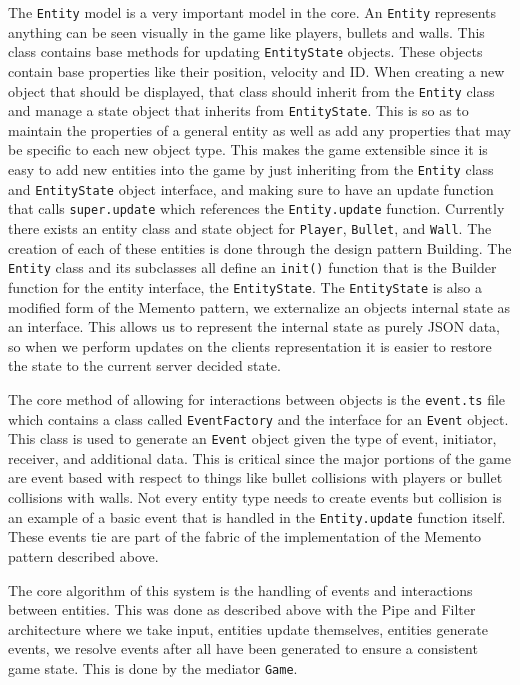 \documentclass[12pt]{report}
\begin{document}
The \texttt{Entity} model is a very important model in the core. An \texttt{Entity} represents anything can be seen visually in the game like players, bullets and walls. This class contains base methods for updating \texttt{EntityState} objects. These objects contain base properties like their position, velocity and ID. When creating a new object that should be displayed, that class should inherit from the \texttt{Entity} class and manage a state object that inherits from \texttt{EntityState}. This is so as to maintain the properties of a general entity as well as add any properties that may be specific to each new object type. This makes the game extensible since it is easy to add new entities into the game by just inheriting from the \texttt{Entity} class and \texttt{EntityState} object interface, and making sure to have an update function that calls \texttt{super.update} which references the \texttt{Entity.update} function. Currently there exists an entity class and state object for \texttt{Player}, \texttt{Bullet}, and \texttt{Wall}. The creation of each of these entities is done through the design pattern Building. The \texttt{Entity} class and its subclasses all define an \texttt{init()} function that is the Builder function for the entity interface, the \texttt{EntityState}. The \texttt{EntityState} is also a modified form of the Memento pattern, we externalize an objects internal state as an interface. This allows us to represent the internal state as purely JSON data, so when we perform updates on the clients representation it is easier to restore the state to the current server decided state.

The core method of allowing for interactions between objects is the \texttt{event.ts} file which contains a class called \texttt{EventFactory} and the interface for an \texttt{Event} object. This class is used to generate an \texttt{Event} object given the type of event, initiator, receiver, and additional data. This is critical since the major portions of the game are event based with respect to things like bullet collisions with players or bullet collisions with walls. Not every entity type needs to create events but collision is an example of a basic event that is handled in the \texttt{Entity.update} function itself. These events tie are part of the fabric of the implementation of the Memento pattern described above. 

The core algorithm of this system is the handling of events and interactions between entities. This was done as described above with the Pipe and Filter architecture where we take input, entities update themselves, entities generate events, we resolve events after all have been generated to ensure a consistent game state. This is done by the mediator \texttt{Game}.
\end{document}
